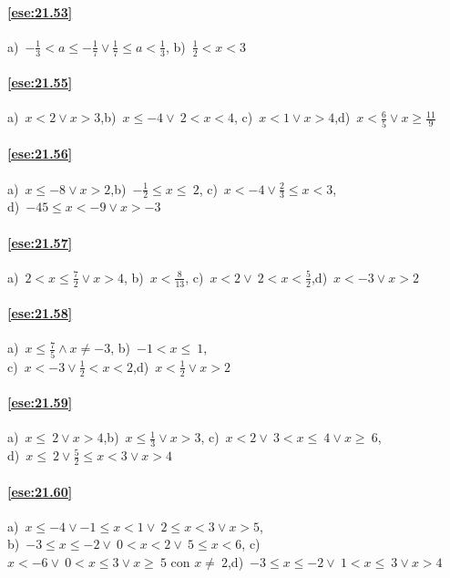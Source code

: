 \begin{multicols}{2}
\paragraph{\ref{ese:21.53}} a)~\(-{\frac{1}{3}}<a\le -{\frac{1}{7}}\vee \frac{1}{7}\le a<\frac{1}{3}\),\quad
b)~\(\frac{1}{2}<x<3\)

\paragraph{\ref{ese:21.55}} a)~\(x<2\vee x>3\),\quad b)~\(x\le -4\vee~2<x<4\),\quad
c)~\(x<1\vee x>4\),\quad d)~\(x<\frac{6}{5}\vee x\ge\frac{11}{9}\)

\paragraph{\ref{ese:21.56}} a)~\(x\le -8\vee x>2\),\quad b)~\(-{\frac{1}{2}}\le x\le~2\),\quad
c)~\(x<-4\vee\frac{2}{3}\le x<3\),\quad \protect\\ d)~\(-45\le x<-9\vee x>-3\)

\paragraph{\ref{ese:21.57}} a)~\(2<x\le \frac{7}{2}\vee x>4\),\quad
b)~\(x<\frac{8}{13}\),\quad
c)~\(x<2\vee~2<x<\frac{5}{2}\),\quad d)~\(x<-3\vee x>2\)

\paragraph{\ref{ese:21.58}} a)~\(x\le \frac{7}{5}\wedge x\neq-3\),\quad
b)~\(-1<x\le~1\),\quad
\protect\\ c)~\(x<-3\vee\frac{1}{2}<x<2\),\quad d)~\(x<\frac{1}{2}\vee x>2\)

\paragraph{\ref{ese:21.59}} a)~\(x\le~2\vee x>4\),\quad b)~\(x\le \frac{1}{3}\vee x>3\),\quad
c)~\(x<2\vee~3<x\le~4\vee x\ge~6\),\quad \protect\\ d)~\(x\le~2\vee \frac{5}{2}\le x<3\vee x>4\)
\end{multicols}
\paragraph{\ref{ese:21.60}} a)~\(x\le -4\vee -1\le x<1\vee~2\le x<3\vee x>5\),\quad
\protect\\ b)~\(-3\le x\le -2\vee~0<x<2\vee~5\le x<6\),\quad
c)~\(x<-6\vee~0<x\le3\vee x\ge~5\text{ con }x\neq~2\),\quad d)~\(-3\le x\le -2\vee~1<x\le~3\vee x>4\)

